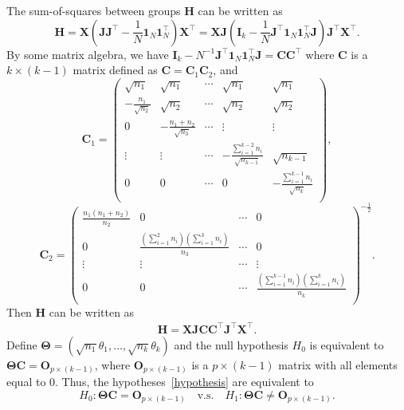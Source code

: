 \documentclass[12pt]{article} %
\newcommand{\bX}{\mathbf{X}}
\newcommand{\bH}{\mathbf{H}}
\newcommand{\bJ}{\mathbf{J}}
\newcommand{\bC}{\mathbf{C}}
\newcommand{\bO}{\mathbf{O}}
\newcommand{\bI}{\mathbf{I}}
\newcommand{\bfsym}[1]{\ensuremath{\boldsymbol{#1}}}
\def\bTheta {\bfsym {\Theta}}
\theoremstyle{definition}
\begin{document}
The sum-of-squares between groups $\bH$ can be written as
$$
        \bH=\bX(\bJ\bJ^\top-\frac{1}{N}\mathbf{1}_N\mathbf{1}_N^\top)\bX^\top
=\bX \bJ(\bI_k-\frac{1}{N}\bJ^\top\mathbf{1}_N \mathbf{1}_N^\top \bJ)\bJ^\top \bX^\top.
$$
By some matrix algebra, we have $\bI_k-N^{-1}\bJ^\top\mathbf{1}_N \mathbf{1}_N^\top \bJ=\bC\bC^\top$
where $\bC$ is a $k\times (k-1)$ matrix defined as $\bC=\bC_1\bC_2$, and
 $$
\bC_1=\begin{pmatrix}
    \sqrt{n_1}&\sqrt{n_1}&\cdots&\sqrt{n_1}&\sqrt{n_1}\\
    -\frac{n_1}{\sqrt{n_2}}&\sqrt{n_2}&\cdots&\sqrt{n_2}&\sqrt{n_2}\\
    0&-\frac{n_1+n_2}{\sqrt{n_3}}&\cdots&\vdots&\vdots\\
    \vdots&\vdots&\cdots&-\frac{\sum_{i=1}^{k-2}n_i}{\sqrt{n_{k-1}}}&\sqrt{n_{k-1}}\\
    0&0&\cdots&0&-\frac{\sum_{i=1}^{k-1}n_i}{\sqrt{n_k}}\\
\end{pmatrix},
 $$
 $$
\bC_2=\begin{pmatrix}
    \frac{n_1(n_1+n_2)}{n_2}&0&\cdots&0\\
    0&\frac{(\sum_{i=1}^2 n_i)(\sum_{i=1}^3 n_i)}{n_3}&\cdots&0\\
    \vdots&\vdots&\cdots&\vdots\\
    0&0&\cdots&\frac{(\sum_{i=1}^{k-1} n_i)(\sum_{i=1}^k n_i)}{n_{k}}\\
\end{pmatrix}^{-\frac{1}{2}}.
$$
Then $\bH$ can be written as
\begin{equation*}
    \begin{aligned}
        \bH=\bX \bJ\bC \bC^\top \bJ^\top \bX^\top.
    \end{aligned}
\end{equation*}
 Define $\bTheta=(\sqrt{n_1}\theta_1,\ldots,\sqrt{n_k}\theta_k)$
 and the null hypothesis $H_0$ is equivalent to $\bTheta \bC=\bO_{p\times (k-1)}$, where $\bO_{p\times (k-1)}$ is a $p\times (k-1)$ matrix with all elements equal to $0$.
 Thus, the hypotheses~\eqref{hypothesis} are equivalent to
 $$
 H_0:\bTheta \bC=\bO_{p\times (k-1)}\quad \text{v.s.}\quad H_1: \bTheta \bC\neq \bO_{p\times (k-1)}.
 $$
\end{document}
